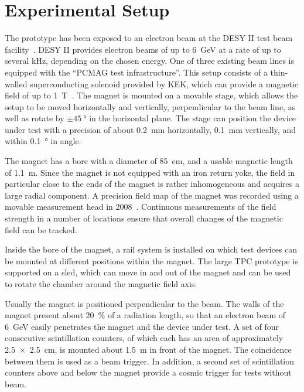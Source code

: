 \documentclass[preprint]{elsarticle}
\begin{document}
\section{Experimental Setup}
The prototype has been exposed to an electron beam at the DESY II test beam fa\-ci\-li\-ty~\cite{DESY2TB}. DESY II provides electron beams of up to \SI{6}{\GeV} at a rate of up to several kHz, depending on the chosen energy. One of three existing beam lines is equipped with the ``PCMAG test infrastructure''. This setup consists of a thin-walled superconducting solenoid provided by KEK, which can provide a magnetic field of up to \SI{1}{\tesla}~\cite{pcmag:magnet}. The magnet is mounted on a movable stage, which allows the setup to be moved horizontally and vertically, perpendicular to the beam line, as well as rotate by $\pm \SI{45}{\degree}$ in the horizontal plane. The stage can position the device under test with a precision of about \SI{0.2}{\mm} horizontally, \SI{0.1}{\mm} vertically, and within \SI{0.1}{\degree} in angle. 

The magnet has a bore with a diameter of \SI{85}{\cm}, and a usable magnetic length of \SI{1.1}{\m}. Since the magnet is not equipped with an iron return yoke, the field in particular close to the ends of the magnet is rather inhomogeneous and acquires a large radial component. A precision field map of the magnet was recorded using a movable measurement head in 2008~\cite{pcmag:fieldmeas,pcmag:fieldana}. Continuous measurements of the field strength in a number of locations ensure that overall changes of the magnetic field can be tracked. 

Inside the bore of the magnet, a rail system is installed on which test devices can be mounted at different positions within the magnet. The large TPC prototype is supported on a sled, which can move in and out of the magnet and can be used to rotate the chamber around the magnetic field axis. 

Usually the magnet is positioned perpendicular to the beam. The walls of the magnet present about \SI{20}{\percent} of a radiation length, so that an electron beam of \SI{6}{\GeV} easily penetrates the magnet and the device under test. A set of four consecutive scintillation counters, of which each has an area of approximately \SI{2.5 x 2.5}{\cm}, is mounted about \SI{1.5}{\m} in front of the magnet. The coincidence between them is used as a beam trigger. In addition, a second set of scintillation counters above and below the magnet provide a cosmic trigger for tests without beam.
\end{document}
